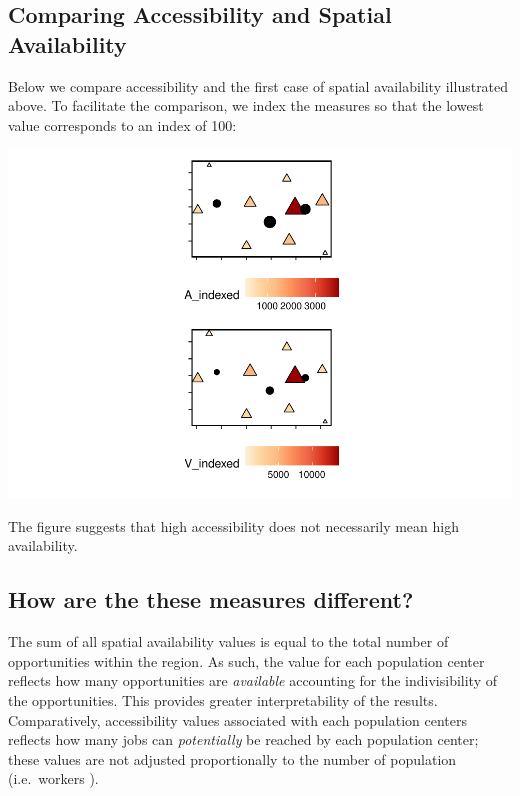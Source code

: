 \documentclass[]{elsarticle} %
\begin{document}
\hypertarget{comparing-accessibility-and-spatial-availability}{%
\subsection{Comparing Accessibility and Spatial
Availability}\label{comparing-accessibility-and-spatial-availability}}

Below we compare accessibility and the first case of spatial
availability illustrated above. To facilitate the comparison, we index
the measures so that the lowest value corresponds to an index of 100:

\includegraphics[width=1\linewidth]{Spatial-Availability_files/figure-latex/indexed-measures-comparison-1}

The figure suggests that high accessibility does not necessarily mean
high availability.

\hypertarget{how-are-the-these-measures-different}{%
\subsection{How are the these measures
different?}\label{how-are-the-these-measures-different}}

The sum of all spatial availability values is equal to the total number
of opportunities within the region. As such, the value for each
population center reflects how many opportunities are \emph{available}
accounting for the indivisibility of the opportunities. This provides
greater interpretability of the results. Comparatively, accessibility
values associated with each population centers reflects how many jobs
can \emph{potentially} be reached by each population center; these
values are not adjusted proportionally to the number of population
(i.e.~workers ).
\end{document}

